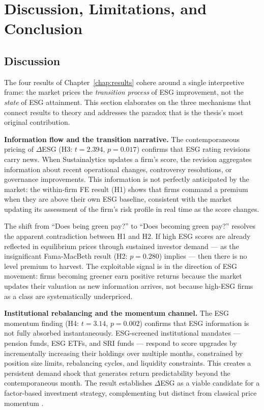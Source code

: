 \chapter{Discussion, Limitations, and Conclusion}
\label{chap:discussion}

\section{Discussion}

The four results of Chapter~\ref{chap:results} cohere around a single interpretive frame: the market prices the \emph{transition process} of ESG improvement, not the \emph{state} of ESG attainment. This section elaborates on the three mechanisms that connect results to theory and addresses the paradox that is the thesis's most original contribution.

\textbf{Information flow and the transition narrative.} The contemporaneous pricing of $\Delta$ESG (H3: $t=2.394$, $p=0.017$) confirms that ESG rating revisions carry news. When Sustainalytics updates a firm's score, the revision aggregates information about recent operational changes, controversy resolutions, or governance improvements. This information is not perfectly anticipated by the market: the within-firm FE result (H1) shows that firms command a premium when they are above their own ESG baseline, consistent with the market updating its assessment of the firm's risk profile in real time as the score changes.

The shift from ``Does being green pay?'' to ``Does becoming green pay?'' resolves the apparent contradiction between H1 and H2. If high ESG scores are already reflected in equilibrium prices through sustained investor demand --- as the insignificant Fama-MacBeth result (H2: $p=0.280$) implies --- then there is no level premium to harvest. The exploitable signal is in the direction of ESG movement: firms becoming greener earn positive returns because the market updates their valuation as new information arrives, not because high-ESG firms as a class are systematically underpriced.

\textbf{Institutional rebalancing and the momentum channel.} The ESG momentum finding (H4: $t=3.14$, $p=0.002$) confirms that ESG information is not fully absorbed instantaneously. ESG-screened institutional mandates --- pension funds, ESG ETFs, and SRI funds --- respond to score upgrades by incrementally increasing their holdings over multiple months, constrained by position size limits, rebalancing cycles, and liquidity constraints. This creates a persistent demand shock that generates return predictability beyond the contemporaneous month. The result establishes $\Delta$ESG as a viable candidate for a factor-based investment strategy, complementing but distinct from classical price momentum \citep{jegadeesh1993returns}.

